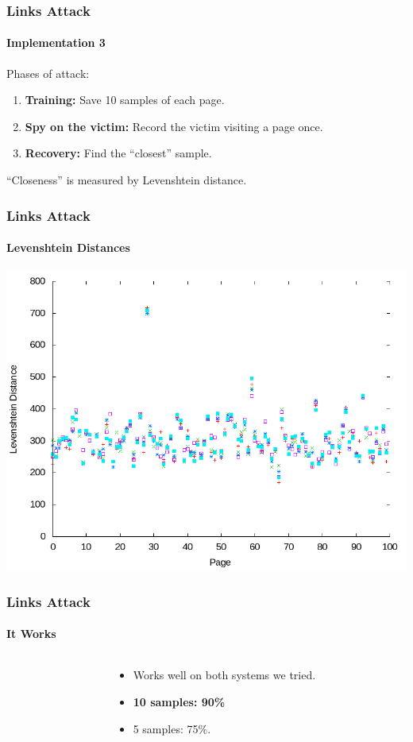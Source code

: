 \documentclass{beamer}
\begin{document}
\begin{frame}
    \frametitle{Links Attack}
    \framesubtitle{Implementation 3}

    Phases of attack:

    \begin{enumerate}
        \item \textbf{Training:} Save 10 samples of each page.
        \item \textbf{Spy on the victim:} Record the victim visiting a page once.
        \item \textbf{Recovery:} Find the ``closest'' sample.
    \end{enumerate}

    ``Closeness'' is measured by Levenshtein distance.
\end{frame}

\begin{frame}
    \frametitle{Links Attack}
    \framesubtitle{Levenshtein Distances}

    \includegraphics[width=\textwidth,keepaspectratio]{distanceplot.png}

\end{frame}

\begin{frame}
    \frametitle{Links Attack}
    \framesubtitle{It Works}

    \begin{columns}
        \begin{column}{0.6\textwidth}
            
        \end{column}
        \begin{column}{0.4\textwidth}
            \begin{itemize}
                \item Works well on both systems we tried.
                \item \textbf{10 samples: 90\%}
                \item 5 samples: 75\%.
            \end{itemize}
        \end{column}
    \end{columns}
\end{frame}
\end{document}
